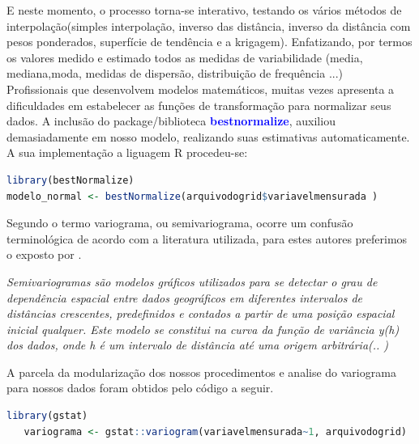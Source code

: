 \hspace*{1.25 cm}  E neste momento, o processo torna-se interativo, testando os vários métodos de interpolação(simples interpolação, inverso das distância, inverso da distância com pesos ponderados, superfície de tendência e a krigagem). Enfatizando, por  termos os valores medido e estimado todos as medidas de variabilidade (media, mediana,moda, medidas de dispersão, distribuição de frequência ...)  \\
%
\hspace*{1.25 cm}  Profissionais que desenvolvem modelos matemáticos, muitas vezes apresenta a dificuldades em estabelecer as funções de transformação para normalizar seus dados. A inclusão  do package/biblioteca \textbf{\textcolor{blue}{bestnormalize}}, auxiliou demasiadamente em nosso modelo, realizando suas estimativas automaticamente. A sua implementação a liguagem R procedeu-se:
 \lstset{
	language=R, %
	caption= normalizacao do modelo em linguagem R,} %
\begin{lstlisting}[language=R]
 library(bestNormalize)
modelo_normal <- bestNormalize(arquivodogrid$variavelmensurada )
\end{lstlisting}  
\hspace*{1.25 cm}  Segundo \cite[P.35]{Yamamoto} o termo variograma, ou semivariograma, ocorre um confusão terminológica de acordo com a literatura utilizada, para estes autores preferimos o exposto por \cite[p.228]{Ferreira}.  \begin{quoting}[rightmargin=0cm,leftmargin=2cm]
	\begin{singlespace}
		{
	\textit{Semivariogramas são modelos gráficos utilizados para se detectar o grau de dependência espacial entre dados geográficos em diferentes intervalos de distâncias crescentes, predefinidos e contados a partir de uma posição espacial inicial qualquer. Este modelo se constitui na curva da função de variância y(h) dos dados, onde h é um intervalo de distância até uma origem arbitrária(.. )}
		}
	\end{singlespace}
\end{quoting}
%
\hspace*{1.25 cm} A  parcela da modularização dos nossos procedimentos e analise do variograma para nossos dados foram obtidos pelo código a seguir.  
 \lstset{
	language=R, %
	caption= Producao do variogramas em linguagem R,} %
\begin{lstlisting}[language=R]
	library(gstat)
   variograma <- gstat::variogram(variavelmensurada~1, arquivodogrid)
\end{lstlisting}  
